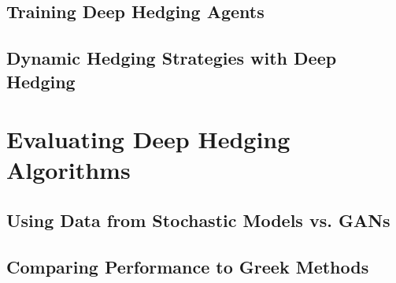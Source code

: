 \subsection{Training Deep Hedging Agents}

\subsection{Dynamic Hedging Strategies with Deep Hedging}

\section{Evaluating Deep Hedging Algorithms}

\subsection{Using Data from Stochastic Models vs. GANs}

\subsection{Comparing Performance to Greek Methods}
 